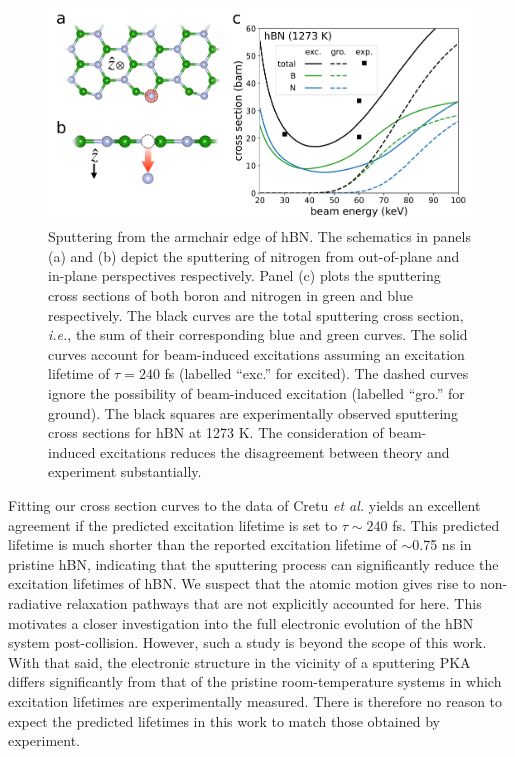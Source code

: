 \documentclass[twoside,twocolumn,9pt]{article}
\begin{document}
\begin{figure} 
  \centering
  \includegraphics[width=.9\textwidth]{figures/edgeCross.pdf}
  \caption{
    Sputtering from the armchair edge of hBN.
    The schematics in panels (a) and (b) depict the sputtering of nitrogen from
    out-of-plane and in-plane perspectives respectively.
    Panel (c) plots the sputtering cross sections of both boron and nitrogen in
    green and blue respectively.
    The black curves are the total sputtering cross section, \textit{i.e.}, the sum of
    their corresponding blue and green curves.
    The solid curves account for beam-induced excitations assuming an
    excitation lifetime of $\tau=240$ fs (labelled ``exc.'' for excited).
    The dashed curves ignore the possibility of beam-induced excitation
    (labelled ``gro.'' for ground).
    The black squares are experimentally observed sputtering cross sections
    for hBN at 1273 K.\cite{Cretu2015}
    The consideration of beam-induced excitations reduces the disagreement
    between theory and experiment substantially.
  }
  \label{fig:edgeCross}
\end{figure}

Fitting our cross section curves to the data of Cretu \textit{et al.} yields an
excellent agreement if the predicted excitation lifetime is set to $\tau \sim
240$ fs.
This predicted lifetime is much shorter than the reported excitation lifetime
of $\sim$0.75 ns in pristine hBN,\cite{Li2016b} indicating that the sputtering
process can significantly reduce the excitation lifetimes of hBN.
We suspect that the atomic motion gives rise to non-radiative relaxation
pathways that are not explicitly accounted for here. 
This motivates a closer investigation into the full electronic evolution of
the hBN system post-collision.
However, such a study is beyond the scope of this work.
With that said, the electronic structure in the vicinity of a sputtering PKA
differs significantly from that of the pristine room-temperature systems in
which excitation lifetimes are experimentally measured.
There is therefore no reason to expect the predicted lifetimes in this
work to match those obtained by experiment.
\end{document}
